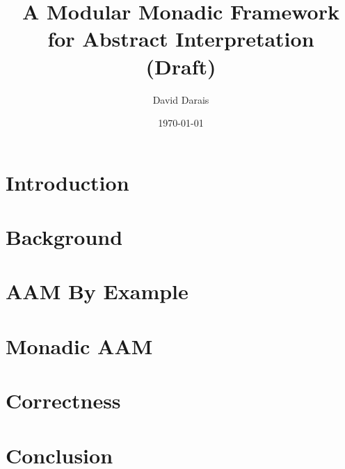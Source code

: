 \documentclass{article}
\title{A Modular Monadic Framework for Abstract Interpretation \\ (Draft)}
\author{David Darais}
\date{\today}
\begin{document}
\maketitle

\begin{abstract}

\end{abstract}

\tableofcontents

\section{Introduction}
\label{section:Introduction}


\section{Background}
\label{section:Background}


\section{AAM By Example}
\label{section:AAMByExample}


\section{Monadic AAM}
\label{section:MonadicAAM}


\section{Correctness}
\label{section:Correctness}


\section{Conclusion}
\label{section:Conclusion}


{}

\end{document}
